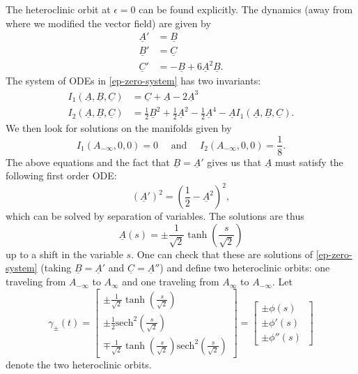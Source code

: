 The heteroclinic orbit at \(\epsilon = 0\) can be found explicitly. The dynamics (away from where we modified the vector field) are given by
\begin{equation}\label{ep-zero-system}
	\begin{aligned}
		\underline A ' &= \underline B \\
		\underline B' &= \underline C \\
		\underline C' &= - \underline B + 6 \underline A^2 \underline B.
	\end{aligned}
\end{equation}
The system of ODEs in \cref{ep-zero-system} has two invariants:
\begin{align}
	I_1(\underline A, \underline B, \underline C) &= \underline C + \underline A - 2 \underline A^3 \\
	I_2(\underline A, \underline B, \underline C) &= \frac 1 2 \underline B^2 + \frac 12 \underline A^2 - \frac 1 2 \underline A^4 - \underline A I_1(\underline A, \underline B, \underline C).
\end{align}
We then look for solutions on the manifolds given by
\begin{equation}
	I_1(A_{-\infty}, 0, 0) = 0 \quad \text{ and } \quad I_2(A_{-\infty}, 0, 0) = \frac 1 8.
\end{equation}
The above equations and the fact that \(\underline B = \underline A'\) gives us that \(\underline A\) must satisfy the following first order ODE:
\begin{equation}
	(\underline A')^2 = \left(\frac  1 2 - \underline A^2\right)^2,
\end{equation}
which can be solved by separation of variables. The solutions are thus
\begin{equation}
	\underline A(s) = \pm \frac{1}{\sqrt 2} \tanh\left(\frac s {\sqrt 2} \right)
\end{equation}
up to a shift in the variable \(s\). One can check that these are solutions of \cref{ep-zero-system} (taking \(\underline B = \underline A'\) and \(\underline C = \underline A''\)) and define two heteroclinic orbits: one traveling from \(A_{-\infty}\) to \(A_\infty\) and one traveling from \(A_{\infty}\) to \(A_{-\infty}\). Let
\begin{equation}\label{heteroclinic-orbit-at-zero}
	\gamma_{\pm} (t) = \begin{bmatrix}
		 \pm\frac 1 {\sqrt 2} \tanh\left(\frac s {\sqrt 2}\right) \\
		 \pm\frac 1 2 \mathrm{sech}^2\left( \frac s {\sqrt 2}\right) \\
		 \mp\frac{1}{\sqrt 2 }\tanh\left(\frac s {\sqrt 2 }\right)\mathrm{sech}^2\left(\frac {s}{\sqrt 2}\right)
	\end{bmatrix} = \begin{bmatrix}
	\pm \phi(s)\\
	\pm \phi'(s) \\
	\pm \phi''(s) \
\end{bmatrix}
\end{equation}
denote the two heteroclinic orbits.

